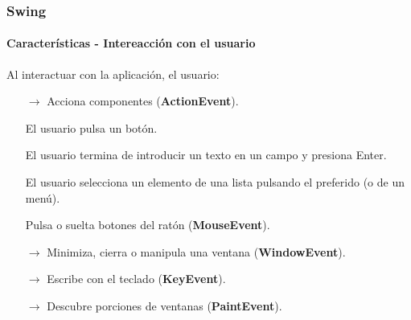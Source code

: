 \documentclass{beamer}
\begin{document}
{ %
    \begin{frame}[plain]
    \end{frame}
}

	\begin{frame}
		\frametitle{Swing}
		\framesubtitle{Caracter\'isticas - Intereacci\'on con el usuario}

        Al interactuar con la aplicaci\'on, el usuario:

	    \begin{itemize}
		    \item[$\rightarrow$] Acciona componentes (\textbf{ActionEvent}).
		    \item[] El usuario pulsa un bot\'on.
		    \item[] El usuario termina de introducir un texto en un campo y presiona Enter.
		    \item[] El usuario selecciona un elemento de una lista pulsando el preferido (o de un men\'u).
		    \item[] Pulsa o suelta botones del rat\'on (\textbf{MouseEvent}).
		    \item[$\rightarrow$] Minimiza, cierra o manipula una ventana (\textbf{WindowEvent}).
		    \item[$\rightarrow$] Escribe con el teclado (\textbf{KeyEvent}).
		    \item[$\rightarrow$] Descubre porciones de ventanas (\textbf{PaintEvent}).
        \end{itemize}
	\end{frame}
\end{document}
